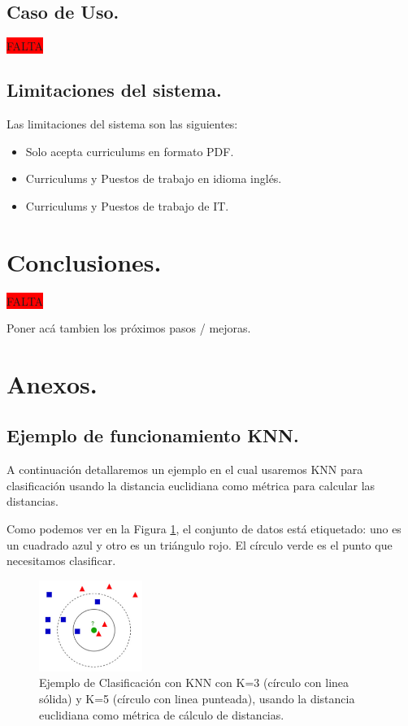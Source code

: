 \documentclass[12pt,a4paper]{article}
\begin{document}
\begin{sloppypar}
\cleardoublepage

\subsection{Caso de Uso.}
\colorbox{red}{FALTA}
\cleardoublepage

\subsection{Limitaciones del sistema.}
Las limitaciones del sistema son las siguientes:
\begin{itemize}
\item Solo acepta curriculums en formato PDF.
\item Curriculums y Puestos de trabajo en idioma inglés. 
\item Curriculums y Puestos de trabajo de IT. 
\end{itemize}

\cleardoublepage

\section{Conclusiones.}
\colorbox{red}{FALTA}

Poner acá tambien los próximos pasos / mejoras.
\cleardoublepage

\section{Anexos.}

\subsection{Ejemplo de funcionamiento KNN.}\label{anexo_knn}

A continuación detallaremos un ejemplo en el cual usaremos KNN para clasificación usando la distancia euclidiana como métrica para calcular las distancias. 

Como podemos ver en la Figura \ref{fig:KNN_example}, el conjunto de datos está etiquetado: uno es un cuadrado azul y otro es un triángulo rojo. El círculo verde es el punto que necesitamos clasificar. 

\begin{figure}[H]    %
 \centering
 \includegraphics[width=0.3\textwidth]{images/KNN_Ejemplo.png}
 \captionsetup{justification=centering,margin=2cm}
 \caption{Ejemplo de Clasificación con KNN con K=3 (círculo con linea sólida) y K=5 (círculo con linea punteada), usando la distancia euclidiana como métrica de cálculo de distancias\cite{KNN_Ejemplo}.} 
 \label{fig:KNN_example}
\end{figure}


\end{sloppypar}
\end{document}
